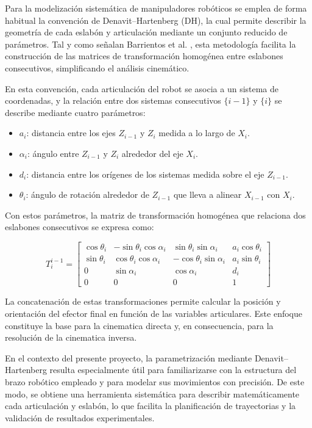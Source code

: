 \documentclass[12pt,a4paper,oneside]{report}
\begin{document}
Para la modelización sistemática de manipuladores robóticos se emplea de forma
habitual la convención de Denavit–Hartenberg (DH), la cual permite describir la
geometría de cada eslabón y articulación mediante un conjunto reducido de
parámetros. Tal y como señalan Barrientos et al. \cite{barrientos2014}, esta
metodología facilita la construcción de las matrices de transformación homogénea
entre eslabones consecutivos, simplificando el análisis cinemático.

En esta convención, cada articulación del \gls{robot} se asocia a un sistema de
coordenadas, y la relación entre dos sistemas consecutivos $\{i-1\}$ y $\{i\}$
se describe mediante cuatro parámetros:

\begin{itemize}
    \item $a_i$: distancia entre los ejes $Z_{i-1}$ y $Z_i$ medida a lo largo de $X_i$.
    \item $\alpha_i$: ángulo entre $Z_{i-1}$ y $Z_i$ alrededor del eje $X_i$.
    \item $d_i$: distancia entre los orígenes de los sistemas medida sobre el eje $Z_{i-1}$.
    \item $\theta_i$: ángulo de rotación alrededor de $Z_{i-1}$ que lleva a alinear $X_{i-1}$ con $X_i$.
\end{itemize}

Con estos parámetros, la matriz de transformación homogénea que relaciona
dos eslabones consecutivos se expresa como:

\begin{equation}
T_i^{i-1} =
\begin{bmatrix}
\cos \theta_i & -\sin \theta_i \cos \alpha_i & \sin \theta_i \sin \alpha_i & a_i \cos \theta_i \\
\sin \theta_i & \cos \theta_i \cos \alpha_i & -\cos \theta_i \sin \alpha_i & a_i \sin \theta_i \\
0 & \sin \alpha_i & \cos \alpha_i & d_i \\
0 & 0 & 0 & 1
\end{bmatrix}
\label{eq:DH_matrix}
\end{equation}

La concatenación de estas transformaciones permite calcular la posición y
orientación del efector final en función de las variables articulares. Este
enfoque constituye la base para la \gls{cinematica} directa y, en consecuencia, para
la resolución de la \gls{cinematica} inversa.

En el contexto del presente proyecto, la parametrización mediante Denavit–
Hartenberg resulta especialmente útil para familiarizarse con la estructura del
brazo robótico empleado y para modelar sus movimientos con precisión. De este
modo, se obtiene una herramienta sistemática para describir matemáticamente
cada articulación y eslabón, lo que facilita la planificación de trayectorias y
la validación de resultados experimentales.
\end{document}
